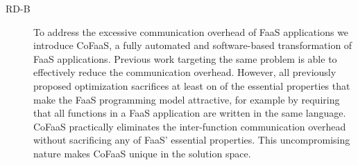 \documentclass[../main.tex]{subfiles}
\begin{document}
\begin{refsection}
\begin{description}
\item[RD-B] To address the excessive communication overhead of FaaS
  applications we introduce CoFaaS, a fully automated and
  software-based transformation of FaaS applications. Previous work
  targeting the same problem is able to effectively reduce the
  communication overhead. However, all previously proposed
  optimization sacrifices at least on of the essential properties that
  make the FaaS programming model attractive, for example by requiring
  that all functions in a FaaS application are written in the same
  language. CoFaaS practically eliminates the inter-function
  communication overhead without sacrificing any of FaaS' essential
  properties. This uncompromising nature makes CoFaaS unique in the
  solution space.

\end{description}




 


\ifx\chapincluded\undefined
  \printbibliography
  \end{refsection}
 \fi
\end{document}
